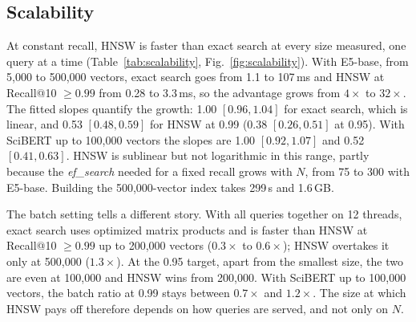 \documentclass[conference, letterpaper]{IEEEtran}
\newcommand{\efs}{\textit{ef\_search}}
\begin{document}
\subsection{Scalability}

At constant recall, HNSW is faster than exact search at every size measured, one query at a time (Table~\ref{tab:scalability}, Fig.~\ref{fig:scalability}). With E5-base, from 5,000 to 500,000 vectors, exact search goes from 1.1 to 107\,ms and HNSW at Recall@10 $\geq 0.99$ from 0.28 to 3.3\,ms, so the advantage grows from $4\times$ to $32\times$. The fitted slopes quantify the growth: 1.00 $[0.96, 1.04]$ for exact search, which is linear, and 0.53 $[0.48, 0.59]$ for HNSW at 0.99 (0.38 $[0.26, 0.51]$ at 0.95). With SciBERT up to 100,000 vectors the slopes are 1.00 $[0.92, 1.07]$ and 0.52 $[0.41, 0.63]$. HNSW is sublinear but not logarithmic in this range, partly because the \efs{} needed for a fixed recall grows with $N$, from 75 to 300 with E5-base. Building the 500,000-vector index takes 299\,s and 1.6\,GB.

The batch setting tells a different story. With all queries together on 12 threads, exact search uses optimized matrix products and is faster than HNSW at Recall@10 $\geq 0.99$ up to 200,000 vectors ($0.3\times$ to $0.6\times$); HNSW overtakes it only at 500,000 ($1.3\times$). At the 0.95 target, apart from the smallest size, the two are even at 100,000 and HNSW wins from 200,000. With SciBERT up to 100,000 vectors, the batch ratio at 0.99 stays between $0.7\times$ and $1.2\times$. The size at which HNSW pays off therefore depends on how queries are served, and not only on $N$.
\end{document}
